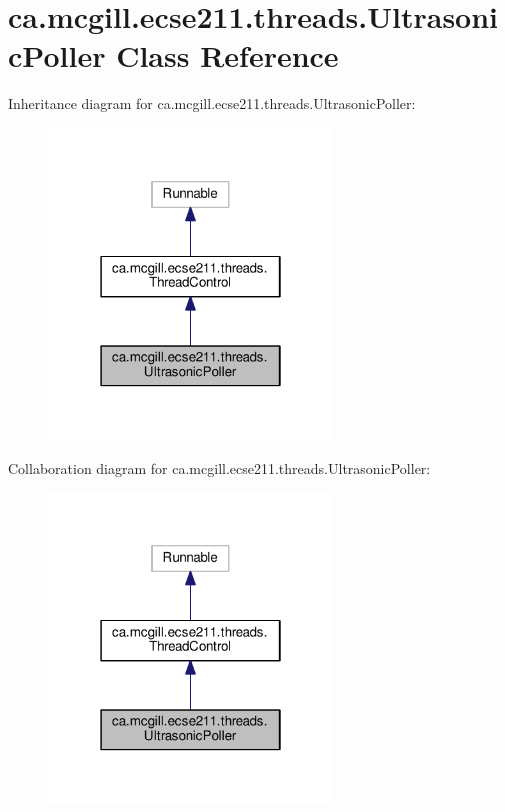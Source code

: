 \hypertarget{classca_1_1mcgill_1_1ecse211_1_1threads_1_1_ultrasonic_poller}{}\section{ca.\+mcgill.\+ecse211.\+threads.\+Ultrasonic\+Poller Class Reference}
\label{classca_1_1mcgill_1_1ecse211_1_1threads_1_1_ultrasonic_poller}


Inheritance diagram for ca.\+mcgill.\+ecse211.\+threads.\+Ultrasonic\+Poller\+:
\nopagebreak
\begin{figure}[H]
\begin{center}
\leavevmode
\includegraphics[width=214pt]{classca_1_1mcgill_1_1ecse211_1_1threads_1_1_ultrasonic_poller__inherit__graph}
\end{center}
\end{figure}


Collaboration diagram for ca.\+mcgill.\+ecse211.\+threads.\+Ultrasonic\+Poller\+:
\nopagebreak
\begin{figure}[H]
\begin{center}
\leavevmode
\includegraphics[width=214pt]{classca_1_1mcgill_1_1ecse211_1_1threads_1_1_ultrasonic_poller__coll__graph}
\end{center}
\end{figure}
